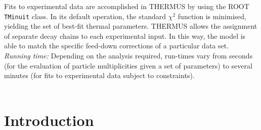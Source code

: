 \documentclass{elsarticle}
\newcounter{bla}
\newenvironment{refnummer}{%
\list{[\arabic{bla}]}%
{\usecounter{bla}%
 \setlength{\itemindent}{0pt}%
 \setlength{\topsep}{0pt}%
 \setlength{\itemsep}{0pt}%
 \setlength{\labelsep}{2pt}%
 \setlength{\listparindent}{0pt}%
 \settowidth{\labelwidth}{[9]}%
 \setlength{\leftmargin}{\labelwidth}%
 \addtolength{\leftmargin}{\labelsep}%
 \setlength{\rightmargin}{0pt}}}
 {\endlist}
\begin{document}
\begin{small}
Fits to experimental data are accomplished in THERMUS by using the ROOT \texttt{TMinuit} class. 
In its default operation, the standard $\chi^2$ function is minimised, yielding the set of best-fit thermal 
parameters. THERMUS allows the assignment of separate decay chains to each experimental input. 
In this way, the model is able to match the specific feed-down corrections of a particular data 
set.\\ 

{\em Running time:} Depending on the analysis required, run-times vary from seconds 
(for the evaluation of particle multiplicities given a set of parameters) to several minutes 
(for fits to experimental data subject to constraints).\\
   \\

\end{small}

\clearpage


\section{Introduction}
\end{document}
